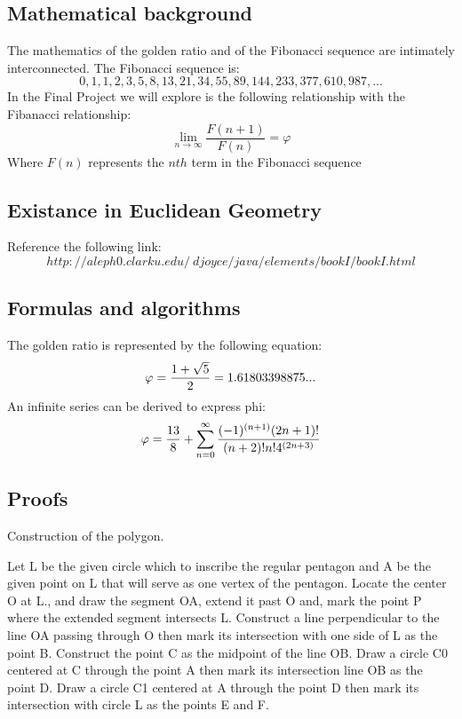 \documentclass{article}
\begin{document}
\subsection{Mathematical background}

The mathematics of the golden ratio and of the Fibonacci sequence are intimately interconnected. The Fibonacci sequence is:
$$
0, 1, 1, 2, 3, 5, 8, 13, 21, 34, 55, 89, 144, 233, 377, 610, 987, ...
$$
In the Final Project we will explore is the following relationship with the Fibanacci relationship:
$$
\lim_{n\to\infty}\frac{F(n+1)}{F(n)}=\varphi
$$
Where $F(n)$ represents the $nth$ term in the Fibonacci sequence

\subsection{Existance in Euclidean Geometry}

Reference the following link:
$$
http://aleph0.clarku.edu/~djoyce/java/elements/bookI/bookI.html
$$

\subsection{Formulas and algorithms}\label{formulas}

The golden ratio is represented by the following equation:
$$
\varphi = {1+\sqrt{5} \over 2} = 1.61803398875...
$$
An infinite series can be derived to express phi:
$$
\varphi = {{13} \over 8} + \sum_{n=0}^{\infty}\frac{(-1)^{(n+1)}(2n+1)!}{(n+2)!n!4^{(2n+3)}}
$$

\subsection{Proofs}

Construction of the polygon.

Let L be the given circle which to inscribe the regular pentagon and A be the given point on L that will serve as one vertex of the pentagon. Locate the center O at L., and draw the segment OA, extend it past O and, mark the point P where the extended segment intersects L. Construct a line perpendicular to the line OA passing through O then mark its intersection with one side of L as the point B. Construct the point C as the midpoint of the line OB. Draw a circle C0 centered at C through the point A then mark its intersection line OB as the point D. Draw a circle C1 centered at A through the point D then mark its intersection with circle L as the points E and F.
\end{document}
